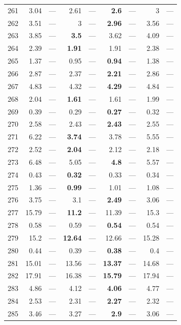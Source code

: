 \begin{longtable}{lr@{\hskip 4pt}l@{\hskip 12pt}r@{\hskip 4pt}l@{\hskip 12pt}r@{\hskip 4pt}l@{\hskip 12pt}r@{\hskip 4pt}l@{\hskip 12pt}}
261 & 3.04 & --- & 2.61 & --- & \textbf{2.6} & --- & 3 & --- \\
262 & 3.51 & --- & 3 & --- & \textbf{2.96} & --- & 3.56 & --- \\
263 & 3.85 & --- & \textbf{3.5} & --- & 3.62 & --- & 4.09 & --- \\
264 & 2.39 & --- & \textbf{1.91} & --- & 1.91 & --- & 2.38 & --- \\
265 & 1.37 & --- & 0.95 & --- & \textbf{0.94} & --- & 1.38 & --- \\
266 & 2.87 & --- & 2.37 & --- & \textbf{2.21} & --- & 2.86 & --- \\
267 & 4.83 & --- & 4.32 & --- & \textbf{4.29} & --- & 4.84 & --- \\
268 & 2.04 & --- & \textbf{1.61} & --- & 1.61 & --- & 1.99 & --- \\
269 & 0.39 & --- & 0.29 & --- & \textbf{0.27} & --- & 0.32 & --- \\
270 & 2.58 & --- & 2.43 & --- & \textbf{2.43} & --- & 2.55 & --- \\
271 & 6.22 & --- & \textbf{3.74} & --- & 3.78 & --- & 5.55 & --- \\
272 & 2.52 & --- & \textbf{2.04} & --- & 2.12 & --- & 2.18 & --- \\
273 & 6.48 & --- & 5.05 & --- & \textbf{4.8} & --- & 5.57 & --- \\
274 & 0.43 & --- & \textbf{0.32} & --- & 0.33 & --- & 0.34 & --- \\
275 & 1.36 & --- & \textbf{0.99} & --- & 1.01 & --- & 1.08 & --- \\
276 & 3.75 & --- & 3.1 & --- & \textbf{2.49} & --- & 3.06 & --- \\
277 & 15.79 & --- & \textbf{11.2} & --- & 11.39 & --- & 15.3 & --- \\
278 & 0.58 & --- & 0.59 & --- & \textbf{0.54} & --- & 0.54 & --- \\
279 & 15.2 & --- & \textbf{12.64} & --- & 12.66 & --- & 15.28 & --- \\
280 & 0.44 & --- & 0.39 & --- & \textbf{0.38} & --- & 0.4 & --- \\
281 & 15.01 & --- & 13.56 & --- & \textbf{13.37} & --- & 14.68 & --- \\
282 & 17.91 & --- & 16.38 & --- & \textbf{15.79} & --- & 17.94 & --- \\
283 & 4.86 & --- & 4.12 & --- & \textbf{4.06} & --- & 4.77 & --- \\
284 & 2.53 & --- & 2.31 & --- & \textbf{2.27} & --- & 2.32 & --- \\
285 & 3.46 & --- & 3.27 & --- & \textbf{2.9} & --- & 3.06 & --- \\

\end{longtable}
